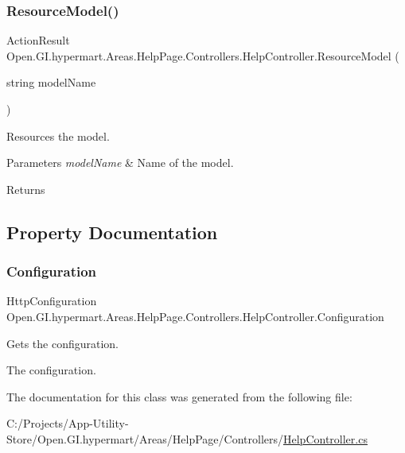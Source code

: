 \subsubsection{\texorpdfstring{Resource\+Model()}{ResourceModel()}}
{\footnotesize\ttfamily Action\+Result Open.\+G\+I.\+hypermart.\+Areas.\+Help\+Page.\+Controllers.\+Help\+Controller.\+Resource\+Model (\begin{DoxyParamCaption}\item[{string}]{model\+Name }\end{DoxyParamCaption})}



Resources the model. 


\begin{DoxyParams}{Parameters}
{\em model\+Name} & Name of the model.\\
\hline
\end{DoxyParams}
\begin{DoxyReturn}{Returns}

\end{DoxyReturn}


\subsection{Property Documentation}
\hypertarget{class_open_1_1_g_i_1_1hypermart_1_1_areas_1_1_help_page_1_1_controllers_1_1_help_controller_ac1327fb5827701100fa4e1b3566fd752}{}\label{class_open_1_1_g_i_1_1hypermart_1_1_areas_1_1_help_page_1_1_controllers_1_1_help_controller_ac1327fb5827701100fa4e1b3566fd752} 
\subsubsection{\texorpdfstring{Configuration}{Configuration}}
{\footnotesize\ttfamily Http\+Configuration Open.\+G\+I.\+hypermart.\+Areas.\+Help\+Page.\+Controllers.\+Help\+Controller.\+Configuration\hspace{0.3cm}{\ttfamily [get]}}



Gets the configuration. 

The configuration. 

The documentation for this class was generated from the following file\+:\begin{DoxyCompactItemize}
\item 
C\+:/\+Projects/\+App-\/\+Utility-\/\+Store/\+Open.\+G\+I.\+hypermart/\+Areas/\+Help\+Page/\+Controllers/\hyperlink{_help_controller_8cs}{Help\+Controller.\+cs}\end{DoxyCompactItemize}
